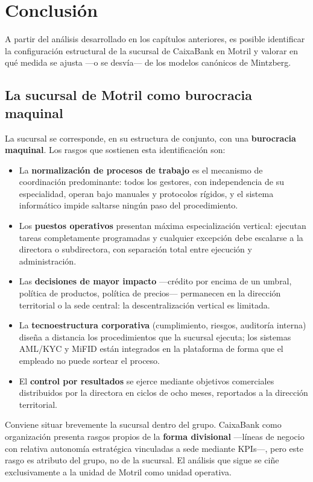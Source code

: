 \section{Conclusión}

A partir del análisis desarrollado en los capítulos anteriores, es posible identificar
la configuración estructural de la sucursal de CaixaBank en Motril y valorar en qué
medida se ajusta ---o se desvía--- de los modelos canónicos de Mintzberg.

\subsection{La sucursal de Motril como burocracia maquinal}

La sucursal se corresponde, en su estructura de conjunto, con una \textbf{burocracia
maquinal}. Los rasgos que sostienen esta identificación son:

\begin{itemize}
  \item La \textbf{normalización de procesos de trabajo} es el mecanismo de coordinación
    predominante: todos los gestores, con independencia de su especialidad, operan bajo
    manuales y protocolos rígidos, y el sistema informático impide saltarse ningún paso
    del procedimiento.
  \item Los \textbf{puestos operativos} presentan máxima especialización vertical:
    ejecutan tareas completamente programadas y cualquier excepción debe escalarse a la
    directora o subdirectora, con separación total entre ejecución y administración.
  \item Las \textbf{decisiones de mayor impacto} ---crédito por encima de un umbral,
    política de productos, política de precios--- permanecen en la dirección territorial
    o la sede central: la descentralización vertical es limitada.
  \item La \textbf{tecnoestructura corporativa} (cumplimiento, riesgos, auditoría
    interna) diseña a distancia los procedimientos que la sucursal ejecuta; los sistemas
    AML/KYC y MiFID están integrados en la plataforma de forma que el empleado no puede
    sortear el proceso.
  \item El \textbf{control por resultados} se ejerce mediante objetivos comerciales
    distribuidos por la directora en ciclos de ocho meses, reportados a la dirección
    territorial.
\end{itemize}

Conviene situar brevemente la sucursal dentro del grupo. CaixaBank como organización
presenta rasgos propios de la \textbf{forma divisional} ---líneas de negocio con
relativa autonomía estratégica vinculadas a sede mediante KPIs---, pero este rasgo es
atributo del grupo, no de la sucursal. El análisis que sigue se ciñe exclusivamente
a la unidad de Motril como unidad operativa.

